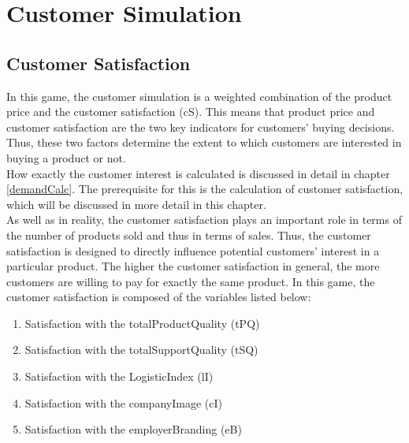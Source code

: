 \section{Customer Simulation}
\label{sec:customsim}
\subsection{Customer Satisfaction}
In this game, the customer simulation is a weighted combination of the product price and the customer satisfaction (cS).
This means that product price and customer satisfaction are the two key indicators for customers' buying decisions. Thus, these two factors determine the extent to which customers are interested in buying a product or not.\\
How exactly the customer interest is calculated is discussed in detail in chapter \ref{demandCalc}. The prerequisite for this is the calculation of customer satisfaction, which will be discussed in more detail in this chapter.\\
As well as in reality, the customer satisfaction plays an important role in terms of the number of products sold and thus in terms of sales. \cite{deptolla_effects_2004}
Thus, the customer satisfaction is designed to directly influence potential customers' interest in a particular product. The higher the customer satisfaction in general, the more customers are willing to pay for exactly the same product. 
In this game, the customer satisfaction is composed of the variables listed below:
\begin{enumerate}
      \item Satisfaction with the totalProductQuality (tPQ)
      \item Satisfaction with the totalSupportQuality (tSQ)
      \item Satisfaction with the LogisticIndex (lI)
      \item Satisfaction with the companyImage (cI)
      \item Satisfaction with the employerBranding (eB)
\end{enumerate}

